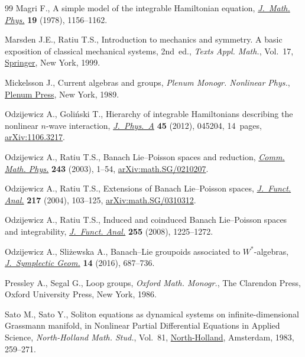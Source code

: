 \documentclass[pdftex]{sigma}
\theoremstyle{definition}
\numberwithin{equation}{section}
\begin{document}
\begin{thebibliography}{99}
Magri F., A simple model of the integrable {H}amiltonian equation,
 \href{https://doi.org/10.1063/1.523777}{\textit{J.~Math. Phys.}} \textbf{19} (1978), 1156--1162.

Marsden J.E., Ratiu T.S., Introduction to mechanics and symmetry. A basic
 exposition of classical mechanical systems, 2nd~ed., \textit{Texts Appl. Math.},
 Vol.~17, \href{https://doi.org/10.1007/978-0-387-21792-5}{Springer}, New York, 1999.

Mickelsson J., Current algebras and groups, \textit{Plenum Monogr. Nonlinear Phys.},
 \href{https://doi.org/10.1007/978-1-4757-0295-8}{Plenum Press}, New York, 1989.

Odzijewicz A., Goli\'nski T., Hierarchy of integrable {H}amiltonians describing
 the nonlinear {$n$}-wave interaction, \href{https://doi.org/10.1088/1751-8113/45/4/045204}{\textit{J.~Phys.~A}} \textbf{45} (2012),
 045204, 14~pages, \href{https://arxiv.org/abs/1106.3217}{arXiv:1106.3217}.

Odzijewicz A., Ratiu T.S., Banach {L}ie--{P}oisson spaces and reduction,
 \href{https://doi.org/10.1007/s00220-003-0948-8}{\textit{Comm. Math. Phys.}} \textbf{243} (2003), 1--54,
 \href{https://arxiv.org/abs/math.SG/0210207}{arXiv:math.SG/0210207}.

Odzijewicz A., Ratiu T.S., Extensions of {B}anach {L}ie--{P}oisson spaces,
 \href{https://doi.org/10.1016/j.jfa.2004.02.012}{\textit{J.~Funct. Anal.}} \textbf{217} (2004), 103--125,
 \href{https://arxiv.org/abs/math.SG/0310312}{arXiv:math.SG/0310312}.

Odzijewicz A., Ratiu T.S., Induced and coinduced {B}anach {L}ie--{P}oisson
 spaces and integrability, \href{https://doi.org/10.1016/j.jfa.2008.06.001}{\textit{J.~Funct. Anal.}} \textbf{255} (2008),
 1225--1272.

Odzijewicz A., Sli\.{z}ewska A., Banach--{L}ie groupoids associated to
 {$W^*$}-algebras, \href{https://doi.org/10.4310/JSG.2016.v14.n3.a3}{\textit{J.~Symplectic Geom.}} \textbf{14} (2016), 687--736.

Pressley A., Segal G., Loop groups, \textit{Oxford Math. Monogr.}, The Clarendon Press,
 Oxford University Press, New York, 1986.

Sato M., Sato Y., Soliton equations as dynamical systems on
 infinite-dimensional {G}rassmann manifold, in Nonlinear {P}artial
 {D}ifferential {E}quations in {A}pplied {S}cience, \textit{North-Holland
 Math. Stud.}, Vol.~81, \href{https://doi.org/10.1016/S0304-0208(08)72096-6}{North-Holland}, Amsterdam, 1983, 259--271.


\end{thebibliography}
\end{document}

